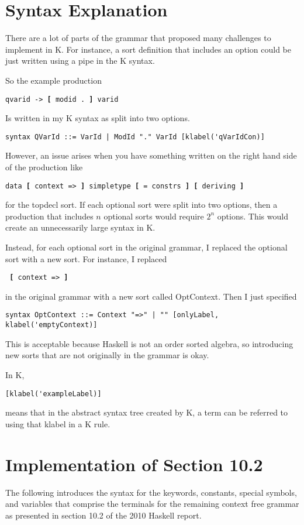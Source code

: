 \section{Syntax Explanation}
There are a lot of parts of the grammar that proposed many challenges to implement in K. For instance, a sort definition that includes an option could be just written using a pipe
in the K syntax.

So the example production

\texttt{qvarid -> \textbf{[} modid . \textbf{]} varid}

Is written in my K syntax as split into two options.
\begin{lstlisting}
syntax QVarId ::= VarId | ModId "." VarId [klabel('qVarIdCon)]
\end{lstlisting}
However, an issue arises when you have something written on the right hand side of the production like

\texttt{data \textbf{[} context => \textbf{]} simpletype \textbf{[} = constrs \textbf{]} \textbf{[} deriving \textbf{]}}

for the topdecl sort. If each optional sort were split into two options, then a production that includes $n$ optional sorts would require $2^n$ options. This would create an unnecessarily large syntax in K.

Instead, for each optional sort in the original grammar, I replaced the optional sort with a new sort. For instance, I replaced

\texttt{ \textbf{[} context => \textbf{]} }

in the original grammar with a new sort called OptContext. Then I just specified
\begin{lstlisting}
syntax OptContext ::= Context "=>" | "" [onlyLabel, klabel('emptyContext)]
\end{lstlisting}
This is acceptable because Haskell is not an order sorted algebra, so introducing new sorts that are not originally in the grammar is okay.

In K,
\begin{lstlisting}
[klabel('exampleLabel)]
\end{lstlisting}
means that in the abstract syntax tree created by K, a term can be referred to using that klabel in a K rule.

\section{Implementation of Section 10.2}
The following introduces the syntax for the keywords, constants, special symbols, and variables that comprise the terminals for the remaining context free grammar as presented in section 10.2 of the 2010 Haskell report.

